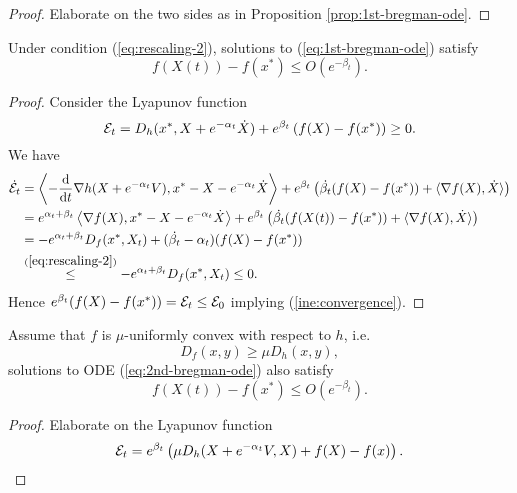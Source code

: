 \begin{proof}
    Elaborate on the two sides as in Proposition \ref{prop:1st-bregman-ode}.
\end{proof}

\begin{theorem}
    Under condition (\ref{eq:rescaling-2}), solutions to (\ref{eq:1st-bregman-ode}) satisfy
    \begin{equation}
        \label{ine:convergence}
        f(X(t)) - f(x^*) \le O\left(e^{-\beta_t}\right).
    \end{equation}
\end{theorem}

\begin{proof}
    Consider the Lyapunov function
    $$\mathcal{E}_t = D_h(x^*, X + e^{-\alpha_t}\dot{X}) + e^{\beta_t}\left(f(X) - f(x^*)\right) \ge 0.$$
    We have
    \begin{align*}
        \dot{\mathcal{E}}_t
         & = \left\langle-\dfrac{\mathrm{d}}{\mathrm{d}t}\nabla h(X + e^{-\alpha_t}V), x^* - X - e^{-\alpha_t}\dot{X} \right\rangle + e^{\beta_t}\left(\dot{\beta_t}(f(X) - f(x^*)) + \langle \nabla f(X), \dot{X}\rangle\right) \\
         & =  e^{\alpha_t+\beta_t}\left\langle\nabla f(X), x^* - X - e^{-\alpha_t}\dot{X} \right\rangle + e^{\beta_t}\left(\dot{\beta_t}(f(X(t)) - f(x^*)) + \langle \nabla f(X), \dot{X}\rangle\right)                          \\
         & = -e^{\alpha_t+\beta_t}D_f(x^*, X_t) + (\dot{\beta_t} - \alpha_t)(f(X)-f(x^*))                                                                                                                                        \\
         & \stackrel{(\ref{eq:rescaling-2})}{\le} -e^{\alpha_t+\beta_t}D_f(x^*, X_t) \le 0.
    \end{align*}
    Hence $e^{\beta_t}(f(X) - f(x^*)) = \mathcal{E}_t \le \mathcal{E}_0$ implying (\ref{ine:convergence}).
\end{proof}

\begin{theorem}
    Assume that $f$ is $\mu$-uniformly convex with respect to $h$, i.e.
    \begin{equation}
        D_f(x,y) \ge \mu D_h(x,y),
    \end{equation}
    solutions to ODE (\ref{eq:2nd-bregman-ode}) also satisfy
    $$f(X(t)) - f(x^*) \le O\left(e^{-\beta_t}\right).$$
\end{theorem}

\begin{proof}
    Elaborate on the Lyapunov function
    \begin{equation}
        \mathcal{E}_t = e^{\beta_t}\left(\mu D_h(X+e^{-\alpha_t}V, X) + f(X) - f(x)\right).
    \end{equation}
\end{proof}

